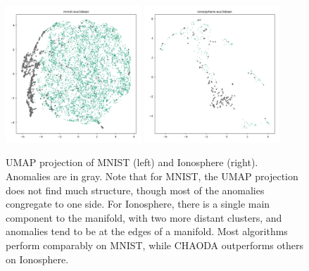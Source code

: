 
\begin{figure}
   \centering
   \includegraphics[width=2in]{images/umaps/mnist-euclidean-umap2d.png}
   \includegraphics[width=2in]{images/umaps/ionosphere-euclidean-umap2d.png}
   \caption{UMAP projection of MNIST (left) and Ionosphere (right). Anomalies are in gray. Note that for MNIST, the UMAP projection does not find much structure, though most of the anomalies congregate to one side. For Ionosphere, there is a single main component to the manifold, with two more distant clusters, and anomalies tend to be at the edges of a manifold. Most algorithms perform comparably on MNIST, while CHAODA outperforms others on Ionosphere.}
   \label{fig:conclusions:umap-embeddings}
\end{figure}

